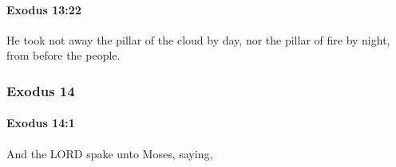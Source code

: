 		\paragraph{Exodus 13:22} %
			\label{EXODUS-13-22}

			He took not away the pillar of the cloud by day, nor the pillar of fire by night, from before the people.

	\subsubsection{Exodus 14} %
		\label{EXODUS-14}

		\paragraph{Exodus 14:1} %
			\label{EXODUS-14-1}

			And the LORD spake unto Moses, saying,

